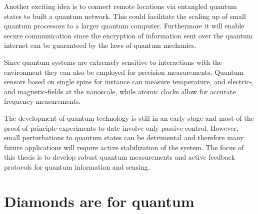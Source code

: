 Another exciting idea is to connect remote locations via entangled quantum states to built a quantum network. This could facilitate the scaling up of small quantum processors to a larger quantum computer. Furthermore it will enable secure communication since the encryption of information sent over the quantum internet can be guaranteed by the laws of quantum mechanics.

Since quantum systems are extremely sensitive to interactions with the environment they can also be employed for precision measurements. Quantum sensors based on single spins for instance can measure temperature, and electric-, and magnetic-fields at the nanoscale, while atomic clocks allow for accurate frequency measurements.

The development of quantum technology is still in an early stage and most of the proof-of-principle experiments to date involve only passive control. However, small perturbations to quantum states can be detrimental and therefore many future applications will require active stabilization of the system. The focus of this thesis is to develop robust quantum measurements and active feedback protocols for quantum information and sensing.
\cite{Taylor_NatPhys_2008}
\section{Diamonds are for quantum}

\clearpage




